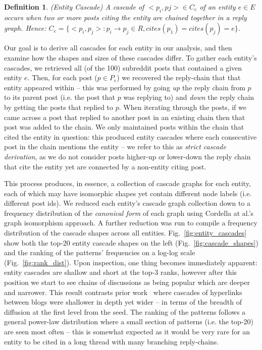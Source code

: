 \documentclass[sigconf]{acmart}
\newtheorem{mydef}{Definition}
\begin{document}
\begin{mydef}
(Entity Cascade) A cascade of ${<p_i, pj>} \in C_e$ of an entity $e \in E$ occurs when two or more posts citing the entity are chained together in a reply graph. 
Hence: $C_e = \{<p_i, p_j> : p_i \rightarrow p_j \in R, cites(p_1) = cites(p_j) = e\}$.
\end{mydef}

Our goal is to derive all cascades for each entity in our analysis, and then examine how the shapes and sizes of these cascades differ.
To gather each entity's cascades, we retrieved all (of the 100) subreddit posts that contained a given entity $e$.
Then, for each post ($p \in P_e$) we recovered the reply-chain that that entity appeared within -- this was performed by going \emph{up} the reply chain from $p$ to its parent post (i.e. the post that $p$ was replying to) and \emph{down} the reply chain by getting the posts that replied to $p$.
When iterating through the posts, if we came across a post that replied to another post in an existing chain then that post was added to the chain.
We only maintained posts within the chain that cited the entity in question: this produced entity cascades where each consecutive post in the chain mentions the entity -- we refer to this as \emph{strict cascade derivation}, as we do not consider posts higher-up or lower-down the reply chain that cite the entity yet are connected by a non-entity citing post. %

This process produces, in essence, a collection of cascade graphs for each entity, each of which may have isomorphic shapes yet contain different node labels (i.e. different post ids).
We reduced each entity's cascade graph collection down to a frequency distribution of the \emph{canonical form} of each graph using Cordella at al.'s~\cite{cordella2001improved} graph isomorphism approach.
A further reduction was run to compile a frequency distribution of the cascade shapes across all entities.
Fig.~\ref{fig:entity_cascades} show both the top-20 entity cascade shapes on the left (Fig.~\ref{fig:cascade_shapes}) and the ranking of the patterns' frequencies on a log-log scale (Fig.~\ref{fig:rank_dist}).
Upon inspection, one thing becomes immediately apparent: entity cascades are shallow and short at the top-3 ranks, however after this position we start to see chains of discussions as being popular which are deeper and narrower.
This result contrasts prior work~\cite{leskovec2007patterns} where cascades of hyperlinks between blogs were shallower in depth yet wider -- in terms of the breadth of diffusion at the first level from the seed. 
The ranking of the patterns follows a general power-law distribution where a small section of patterns (i.e. the top-20) are seen most often -- this is somewhat expected as it would be very rare for an entity to be cited in a long thread with many branching reply-chains.
\end{document}
